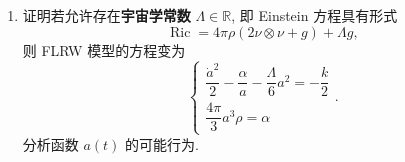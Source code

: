 \begin{RiemannExercise}
\begin{enumerate}[label=(\arabic*),ref=\arabic*,leftmargin=*]
\[\begin{cases}
    m=\alpha r_0^3\\
    E^2-1=-kr_0^2
  \end{cases},
\]
则 FLRW 模型中球壳 $r=r_0$ 的半径随固有时变化的方式, 与质量参数为 $m$ 的 Schwarzschild 时空中以能量参数 $E$ 作径向自由下落运动的球壳的半径变化方式完全相同 [参见 Exercise~\ref{ex:schwarzschild-solution}(\ref{ex:schwarzschild-orbits-and-light-deflection})]. 因此, 可沿球壳运动确定的三维超曲面将这两个时空匹配, 得到一个物质坍缩的模型. 你能给出这个模型的物理解释吗?
\item\label{ex:flrw-with-cosmological-constant}
证明若允许存在\textbf{宇宙学常数} $\Lambda\in\mathbb{R}$, 即 Einstein 方程具有形式
\[
  \operatorname{Ric}=4\pi\rho(2\nu\otimes\nu+g)+\Lambda g,
\]
则 FLRW 模型的方程变为
\[
  \begin{cases}
    \dfrac{\dot a^2}{2}-\dfrac{\alpha}{a}-\dfrac{\Lambda}{6}a^2=-\dfrac{k}{2}\\[.6ex]
    \dfrac{4\pi}{3}a^3\rho=\alpha
  \end{cases}.
\]
分析函数 $a(t)$ 的可能行为.


\end{enumerate}
\end{RiemannExercise}
